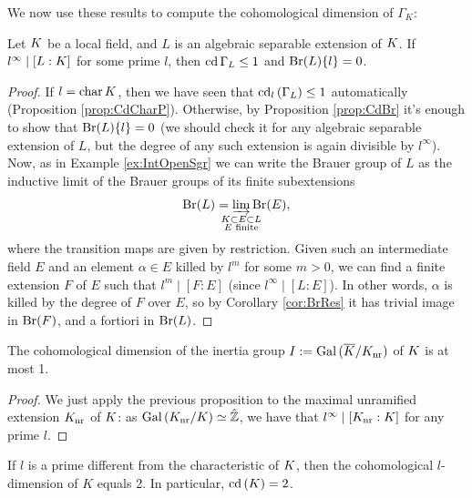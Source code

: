 \documentclass[a4paper, oneside]{memoir}
\begin{document}
We now use these results to compute the cohomological dimension of $\Gamma_K$:

\begin{proposition}
    Let $K$ be a local field, and $L$ is an algebraic separable extension of $K$. If $l^\infty \mid [L:K]$ for some prime $l$, then $\operatorname{cd}{\Gamma_L}\leq 1$ and $\mathrm{Br}(L)\{l\}=0$.
\end{proposition}

\begin{proof}
    If $l = \operatorname{char}{K}$, then we have seen that $\operatorname{cd}_l{(\Gamma_L)}\leq 1$ automatically (Proposition \ref{prop:CdCharP}).
    Otherwise, by Proposition \ref{prop:CdBr} it's enough to show that $\mathrm{Br}(L)\{l\}=0$ (we should check it for any algebraic separable extension of $L$, but the degree of any such
    extension is again divisible by $l^\infty$).
    Now, as in Example \ref{ex:IntOpenSgr} we can write the Brauer group of $L$ as the inductive limit of the Brauer groups of its finite subextensions
    \[
        \Br{L}=\varinjlim_{\mathclap{\substack{\K\subset E\subset L \\ E\text{ finite}}}}{\Br{E}},
    \]
    where the transition maps are given by restriction.
    Given such an intermediate field $E$ and an element $\alpha\in E$ killed by $l^m$ for some $m>0$, we can find a finite extension $F$ of $E$ such that $l^m\mid [F:E]$ (since
    $l^\infty\mid [L:E]$). In other words, $\alpha$ is killed by the degree of $F$ over $E$, so by Corollary \ref{cor:BrRes} it has trivial image in $\mathrm{Br}(F)$, and a fortiori in $\mathrm{Br}(L)$.

\end{proof}

\begin{corollary}
    The cohomological dimension of the inertia group $I:=\operatorname{Gal}{(\overline{K}/K_{\text{nr}})}$ of $K$ is at most 1.
\end{corollary}

\begin{proof}
    We just apply the previous proposition to the maximal unramified extension $K_{\text{nr}}$ of $K$: as $\operatorname{Gal}{(K_{\text{nr}}/K)}\simeq\hat{\mathbb{Z}}$, we have that
    $l^\infty\mid [K_{\text{nr}}:K]$ for any prime $l$.
\end{proof}

\begin{theorem}\label{thm:CohomFin}
    If $l$ is a prime different from the characteristic of $K$, then the cohomological $l$-dimension of $K$ equals 2. In particular, $\operatorname{cd}{(K)}=2$.
\end{theorem}
\end{document}
